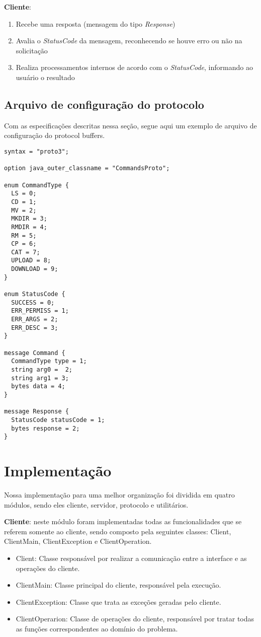 \documentclass[
	11pt,				%
	oneside,			%
	a4paper,			%
	english,			%
	brazil,				%
	]{article}
\begin{document}
\noindent \textbf{Cliente}:
\begin{enumerate}
 \item Recebe uma resposta (mensagem do tipo \textit{Response})
 \item Avalia o \textit{StatusCode} da mensagem, reconhecendo se houve erro ou não na solicitação
 \item Realiza processamentos internos de acordo com o \textit{StatusCode}, informando ao usuário o resultado
\end{enumerate}

\subsection{Arquivo de configuração do protocolo}
Com as especificações descritas nessa seção, segue aqui um exemplo de arquivo de configuração do protocol buffers.

\begin{verbatim}
syntax = "proto3";

option java_outer_classname = "CommandsProto";

enum CommandType {
  LS = 0;
  CD = 1;
  MV = 2;
  MKDIR = 3;
  RMDIR = 4;
  RM = 5;
  CP = 6;
  CAT = 7;
  UPLOAD = 8;
  DOWNLOAD = 9;
}

enum StatusCode {
  SUCCESS = 0;
  ERR_PERMISS = 1;
  ERR_ARGS = 2;
  ERR_DESC = 3;
}

message Command {
  CommandType type = 1;
  string arg0 =  2;
  string arg1 = 3;
  bytes data = 4;
}

message Response {
  StatusCode statusCode = 1;
  bytes response = 2;
}
\end{verbatim}

\section{Implementação}
Nossa implementação para uma melhor organização foi dividida em quatro módulos, sendo eles cliente, servidor, protocolo e utilitários.

\textbf{Cliente}: neste módulo foram implementadas todas as funcionalidades que se referem somente ao cliente, sendo composto pela seguintes classes: Client, ClientMain, ClientException e ClientOperation.

\begin{itemize}
 \item Client: Classe responsável por realizar a comunicação entre a interface e as operações do cliente. 
 \item ClientMain: Classe principal do cliente, responsável pela execução.
 \item ClientException: Classe que trata as exceções geradas pelo cliente.
 \item ClientOperarion: Classe de operações do cliente, responsável por tratar todas as funções correspondentes ao domínio do problema.
\end{itemize}
\end{document}
